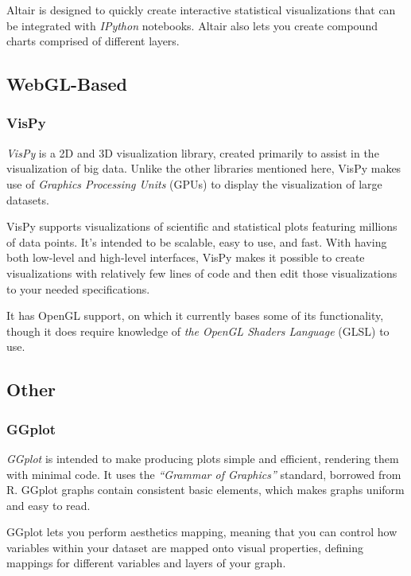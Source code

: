 \documentclass[11pt]{article}
\begin{document}
Altair is designed to quickly create interactive statistical
visualizations that can be integrated with \emph{IPython} notebooks.
Altair also lets you create compound charts comprised of different
layers.

\subsection{WebGL-Based}\label{webgl-based}

\subsubsection{VisPy}\label{vispy}

\emph{VisPy} is a 2D and 3D visualization library, created primarily to
assist in the visualization of big data. Unlike the other libraries
mentioned here, VisPy makes use of \emph{Graphics Processing Units}
(GPUs) to display the visualization of large datasets.

VisPy supports visualizations of scientific and statistical plots
featuring millions of data points. It's intended to be scalable, easy to
use, and fast. With having both low-level and high-level interfaces,
VisPy makes it possible to create visualizations with relatively few
lines of code and then edit those visualizations to your needed
specifications.

It has OpenGL support, on which it currently bases some of its
functionality, though it does require knowledge of \emph{the OpenGL
Shaders Language} (GLSL) to use.

\subsection{Other}\label{other}

\subsubsection{GGplot}\label{ggplot}

\emph{GGplot} is intended to make producing plots simple and efficient,
rendering them with minimal code. It uses the \emph{``Grammar of
Graphics''} standard, borrowed from R. GGplot graphs contain consistent
basic elements, which makes graphs uniform and easy to read.

GGplot lets you perform aesthetics mapping, meaning that you can control
how variables within your dataset are mapped onto visual properties,
defining mappings for different variables and layers of your graph.
\end{document}
